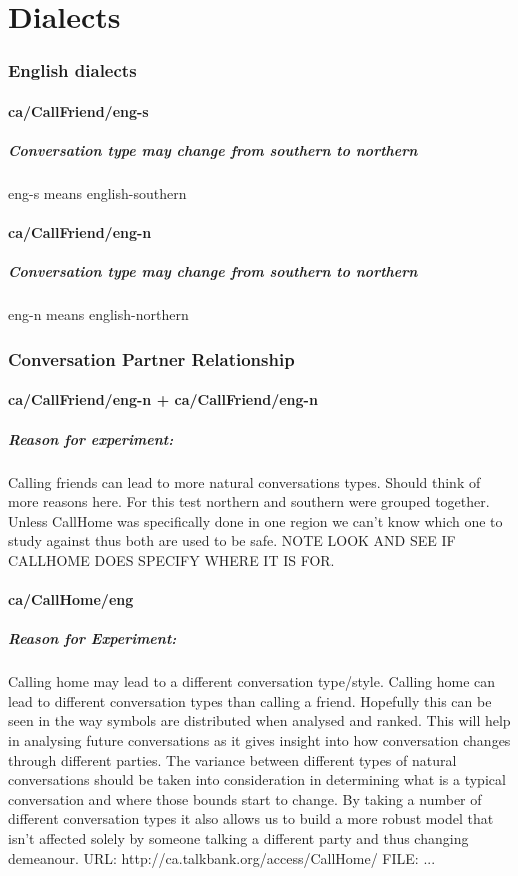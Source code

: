 \section{Dialects}
\subsubsection{English dialects}

\paragraph{ca/CallFriend/eng-s}
\subparagraph{Conversation type may change from southern to northern}
eng-s means english-southern

\paragraph{ca/CallFriend/eng-n}
\subparagraph{Conversation type may change from southern to northern}
eng-n means english-northern

\subsubsection{Conversation Partner Relationship}
\paragraph{ca/CallFriend/eng-n + ca/CallFriend/eng-n}
\subparagraph{Reason for experiment: } Calling friends can lead to more natural conversations types. Should think of more reasons here.
For this test northern and southern were grouped together. Unless CallHome was specifically done in one region we can't know which one to study against thus both are used to be safe. NOTE LOOK AND SEE IF CALLHOME DOES SPECIFY WHERE IT IS FOR.

\paragraph{ca/CallHome/eng}
\subparagraph{Reason for Experiment: } Calling home may lead to a different conversation type/style. Calling home can lead to different conversation types than calling a friend. Hopefully this can be seen in the way symbols are distributed when analysed and ranked. This will help in analysing future conversations as it gives insight into how conversation changes through different parties. The variance between different types of natural conversations should be taken into consideration in determining what is a typical conversation and where those bounds start to change. By taking a number of different conversation types it also allows us to build a more robust model that isn't affected solely by someone talking a different party and thus changing demeanour.
URL: http://ca.talkbank.org/access/CallHome/
FILE: ...

